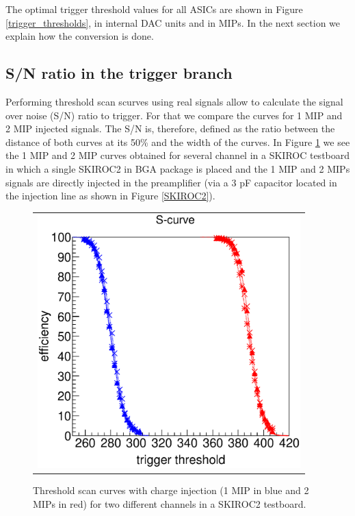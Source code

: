 \documentclass[a4paper,11pt]{article}
\begin{document}
The optimal trigger threshold values for all ASICs are shown in Figure \ref{trigger_thresholds}, in internal DAC units and in MIPs. In the next section we explain how the conversion is done.

\subsection{S/N ratio in the trigger branch}
\label{sec:comm_trigger_sn}

Performing threshold scan scurves using
real signals allow to calculate the signal over noise (S/N) ratio to trigger.
For that we compare the curves for 1 MIP and 2 MIP injected signals.
The S/N is, therefore, defined as the ratio between the distance of both curves at its
50\% and the width of the curves.
In Figure \ref{scurves_injection} we see the 1 MIP and 2 MIP curves obtained for several channel
in a SKIROC testboard in which a single SKIROC2 in BGA package is placed and the 1 MIP and 2 MIPs 
 signals are directly injected in the preamplifier 
(via a 3 pF capacitor located in the injection line as shown in Figure \ref{SKIROC2}). 


\begin{figure}[!t]
    \centering
  \begin{tabular}{l}
	\includegraphics[width=4in]{../figs/commissioning/scurve_pp_fastshaper_ch.eps} \\
	\end{tabular}
\caption{Threshold scan curves with charge injection (1 MIP in blue and 2 MIPs in red) for two different channels in a SKIROC2 testboard.}
\label{scurves_injection}
\end{figure}
\end{document}
